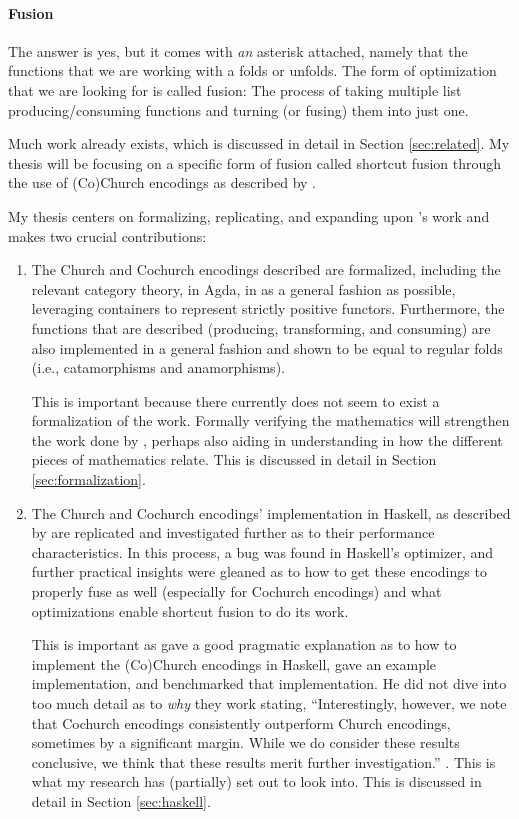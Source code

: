 \paragraph{Fusion}
The answer is yes{\Large*}, but it comes with \textit{an} asterisk attached, namely that the functions that we are working with a folds or unfolds.
The form of optimization that we are looking for is called fusion:
The process of taking multiple list producing/consuming functions and turning (or fusing) them into just one.

Much work already exists, which is discussed in detail in Section \ref{sec:related}.
My thesis will be focusing on a specific form of fusion called shortcut fusion through the use of (Co)Church encodings as described by \cite{Harper2011}.

My thesis centers on formalizing, replicating, and expanding upon \cite{Harper2011}'s work and makes two crucial contributions:
\begin{enumerate}
    \item The Church and Cochurch encodings described are formalized, including the relevant category theory, in Agda, in as a general fashion as possible, leveraging containers \citep{Abbott2005} to represent strictly positive functors.
    Furthermore, the functions that are described (producing, transforming, and consuming) are also implemented in a general fashion and shown to be equal to regular folds (i.e., catamorphisms and anamorphisms).

    This is important because there currently does not seem to exist a formalization of the work.
    Formally verifying the mathematics will strengthen the work done by \cite{Harper2011}, perhaps also aiding in understanding in how the different pieces of mathematics relate.
    This is discussed in detail in Section \ref{sec:formalization}.
    \item The Church and Cochurch encodings' implementation in Haskell, as described by \cite{Harper2011} are replicated and investigated further as to their performance characteristics.
    In this process, a bug was found in Haskell's optimizer, and further practical insights were gleaned as to how to get these encodings to properly fuse as well (especially for Cochurch encodings) and what optimizations enable shortcut fusion to do its work.

    This is important as \cite{Harper2011} gave a good pragmatic explanation as to how to implement the (Co)Church encodings in Haskell, gave an example implementation, and benchmarked that implementation.
    He did not dive into too much detail as to \textit{why} they work stating, ``Interestingly, however, we note that Cochurch encodings consistently outperform Church encodings, sometimes by a significant margin. While we do consider these results conclusive, we think that these results merit further investigation.'' \citep{Harper2011}.
    This is what my research has (partially) set out to look into.
    This is discussed in detail in Section \ref{sec:haskell}.
\end{enumerate}




